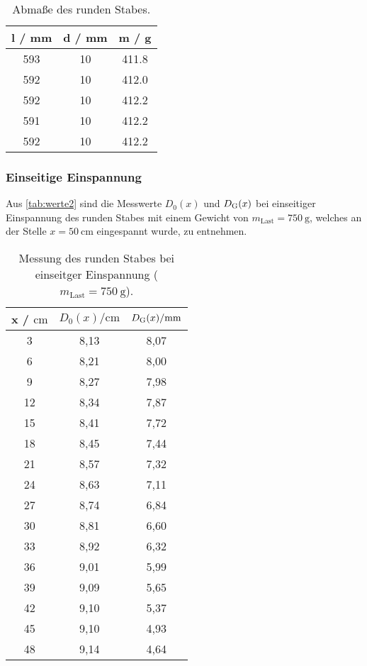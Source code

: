 \sloppy
\begin{table}[H]
  \centering
  \caption{Abmaße des runden Stabes.}
  \label{tab:stabRund}
  \begin{tabular}{c c c}
    \toprule
    l / mm & d / mm & m / g \\
    \midrule
    593 & 10 & 411.8 \\
    592 & 10 & 412.0 \\
    592 & 10 & 412.2 \\
    591 & 10 & 412.2 \\
    592 & 10 & 412.2 \\
    \bottomrule
  \end{tabular}
\end{table}

\subsubsection{Einseitige Einspannung}
\label{subsubsec:rundEinsEing}

Aus \autoref{tab:werte2} sind die Messwerte $D_0(x)$ und $D_{\text G}(x)$ bei einseitiger Einspannung des runden Stabes mit
einem Gewicht von $m_{\text{Last}} = \SI{750}{\gram}$, welches an der Stelle $x= \SI{50}{\cm}$ eingespannt wurde, zu entnehmen.


\sloppy
\begin{table}[H]
  \centering
  \caption{Messung des runden Stabes bei einseitger Einspannung ($m_{\text{Last}} = \SI{750}{\gram}$).}
  \label{tab:werte2}
  \begin{tabular}{c c c}
    \toprule
    x / $\si{\centi\meter} $ & $ D_0(x) / \si{\centi\meter}$ & $D_{\text G}(x) / \si{\milli\meter}$ \\
    \midrule
    3 & 8,13 & 8,07 \\
    6 & 8,21 & 8,00 \\
    9 & 8,27 & 7,98 \\
    12 & 8,34 & 7,87 \\
    15 & 8,41 & 7,72 \\
    18 & 8,45 & 7,44 \\
    21 & 8,57 & 7,32 \\
    24 & 8,63 & 7,11 \\
    27 & 8,74 & 6,84 \\
    30 & 8,81 & 6,60 \\
    33 & 8,92 & 6,32 \\
    36 & 9,01 & 5,99 \\
    39 & 9,09 & 5,65 \\
    42 & 9,10 & 5,37 \\
    45 & 9,10 & 4,93 \\
    48 & 9,14 & 4,64 \\
    \bottomrule
  \end{tabular}
\end{table}

